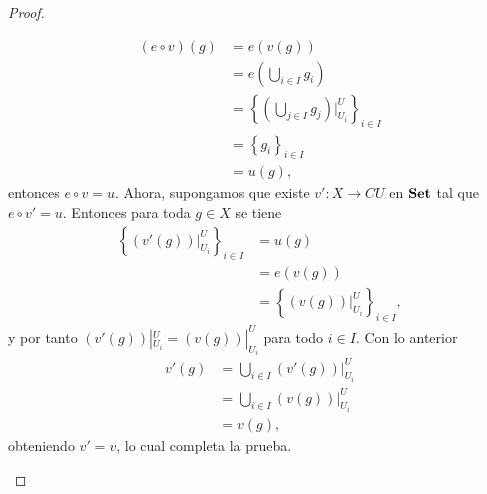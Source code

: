\begin{proof}
\begin{itemize}
$$\begin{aligned}
            (e\circ v)(g)&=e(v(g))\\
                         &=e(\bigcup_{i\in I}g_i)\\
                         &=\left\lbrace (\bigcup_{j\in I}g_j)|^U_{U_i}\right\rbrace_{i\in I}\\
                         &=\left\lbrace g_i\right\rbrace_{i\in I}\\
                         &=u(g),
         \end{aligned}
         $$
         entonces $e\circ v=u$. Ahora, supongamos que existe $v':X\to CU$ en $\normalfont{\textbf{Set}}$ tal que $e\circ v'=u$. Entonces para toda $g\in X$ se tiene
         $$
         \begin{aligned}
            \left\lbrace (v'(g))|^U_{U_i}\right\rbrace_{i\in I}&=u(g)\\
                                                               &=e(v(g))\\
                                                               &=\left\lbrace (v(g))|^U_{U_i}\right\rbrace_{i\in I},
         \end{aligned}
         $$
         y por tanto $(v'(g))|^U_{U_i}=(v(g))|^U_{U_i}$ para todo $i\in I$. Con lo anterior
         $$
         \begin{aligned}
            v'(g)&=\bigcup_{i\in I}(v'(g))|^U_{U_i}\\
                 &=\bigcup_{i\in I}(v(g))|^U_{U_i}\\
                 &=v(g),
         \end{aligned}
         $$
         obteniendo $v'=v$, lo cual completa la prueba.  
   \end{itemize}
\end{proof}
